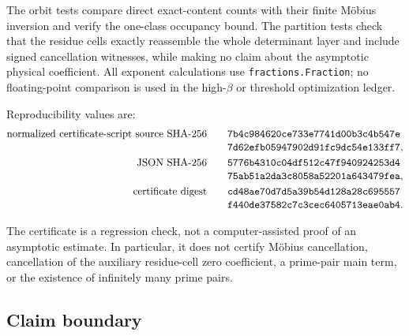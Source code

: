 The orbit tests compare direct exact-content counts with their finite
M\"obius inversion and verify the one-class occupancy bound.  The
partition tests check that the residue cells exactly reassemble the
whole determinant layer and include signed cancellation witnesses,
while making no claim about the asymptotic physical coefficient.  All
exponent calculations use \texttt{fractions.Fraction}; no
floating-point comparison is used in the high-$\beta$ or threshold
optimization ledger.

Reproducibility values are:
\begin{align}
 \text{normalized certificate-script source SHA-256}\qquad
 &\texttt{7b4c984620ce733e7741d00b3c4b547e}\notag\\[-0.2em]
 &\texttt{7d62efb05947902d91fc9dc54e133ff7},
 \label{eq:tpc31-source-hash}\\
 \text{JSON SHA-256}\qquad
 &\texttt{5776b4310c04df512c47f940924253d4}\notag\\[-0.2em]
 &\texttt{75ab51a2da3c8058a52201a643479fea},
 \label{eq:tpc31-json-hash}\\
 \text{certificate digest}\qquad
 &\texttt{cd48ae70d7d5a39b54d128a28c695557}\notag\\[-0.2em]
 &\texttt{f440de37582c7c3cec6405713eae0ab4}.
 \label{eq:tpc31-certificate-digest}
\end{align}

The certificate is a regression check, not a computer-assisted proof
of an asymptotic estimate.  In particular, it does not certify
M\"obius cancellation, cancellation of the auxiliary residue-cell zero
coefficient, a prime-pair main term, or the existence of infinitely
many prime pairs.

\subsection{Claim boundary}

